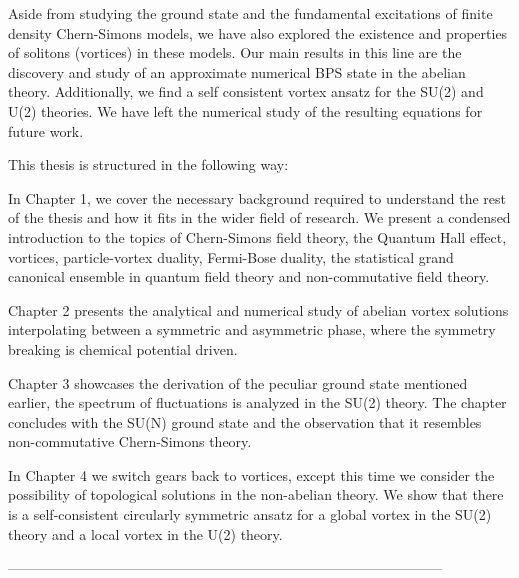     Aside from studying the ground state and the fundamental excitations of finite density Chern-Simons models, we have also explored the existence and properties of solitons (vortices) in these models. Our main results in this line are the discovery and study of an approximate numerical BPS state in the abelian theory. Additionally, we find a self consistent vortex ansatz for the SU(2) and U(2) theories. We have left the numerical study of the resulting equations for future work.

    This thesis is structured in the following way:

    In Chapter 1, we cover the necessary background required to understand the rest of the thesis and how it fits in the wider field of research. We present a condensed introduction to the topics of Chern-Simons field theory, the Quantum Hall effect, vortices, particle-vortex duality, Fermi-Bose duality, the statistical grand canonical ensemble in quantum field theory and non-commutative field theory.

    Chapter 2 presents the analytical and numerical study of abelian vortex solutions interpolating between a symmetric and asymmetric phase, where the symmetry breaking is chemical potential driven.

    Chapter 3 showcases the derivation of the peculiar ground state mentioned earlier, the spectrum of fluctuations is analyzed in the SU(2) theory. The chapter concludes with the SU(N) ground state and the observation that it resembles non-commutative Chern-Simons theory.

    In Chapter 4 we switch gears back to vortices, except this time we consider the possibility of topological solutions in the non-abelian theory. We show that there is a self-consistent circularly symmetric ansatz for a global vortex in the SU(2) theory and a local vortex in the U(2) theory.


---------------------------------------------------------------------------------------------

